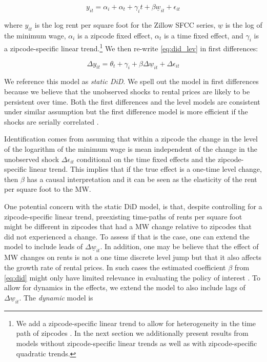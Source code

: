 \begin{equation}\label{eq:did_lev}
    y_{it} = \alpha_i + \alpha_t + \gamma_i t + \beta \underline{w}_{it} + \epsilon_{it}
\end{equation}
    
where $y_{it}$ is the log rent per square foot for the Zillow SFCC series, $\underline{w}$ is the 
log of the minimum wage, $\alpha_i$ is a zipcode fixed effect, $\alpha_t$ is a time fixed effect, 
and $\gamma_i$ is a zipcode-specific linear trend.\footnote{We add a zipcode-specific linear trend 
	to allow for heterogeneity in the time path of zipcodes \parencite{angrist2008mostly}. In the 
	next section we additionally present results from models without zipcode-specific linear trends 
	as well as with zipcode-specific quadratic trends.} 
We then re-write \autoref{eq:did_lev} in first differences:
    
\begin{equation}\label{eq:did}
        \Delta y_{it} = \theta_t + \gamma_i + \beta \Delta \underline{w}_{it} + \Delta \epsilon_{it}
\end{equation}

We reference this model as \textit{static DiD}. We spell out the model in first differences because 
we believe that the unobserved shocks to rental prices are likely to be persistent over time. Both 
the first differences and the level models are consistent under similar assumption but the first 
difference model is more efficient if the shocks are serially correlated \parencite{wooldridge2010}.

Identification comes from assuming that within a zipcode the change in the level of the logarithm 
of the minimum wage is mean independent of the change in the unobserved shock $\Delta \epsilon_{it}$ 
conditional on the time fixed effects and the zipcode-specific linear trend. This implies that if 
the true effect is a one-time level change, then $\beta$ has a causal interpretation and it can be 
seen as the elasticity of the rent per square foot to the MW.
    
One potential concern with the static DiD model, is that, despite controlling for a zipcode-specific 
linear trend, preexisting time-paths of rents per square foot might be different in zipcodes that 
had a MW change relative to zipcodes that did not experienced a change. To assess if that is the 
case, one can extend the model to include leads of $\Delta \underline{w}_{it}$. In addition, one 
may be believe that the effect of MW changes on rents is not a one time discrete level jump but that 
it also affects the growth rate of rental prices. In such cases the estimated coefficient $\beta$ 
from \autoref{eq:did} might only have limited relevance in evaluating the policy of interest 
\parencite{callaway2019difference}. To allow for dynamics in the effects, we extend the model to 
also include lags of $\Delta \underline{w}_{it}$. The \textit{dynamic} model is

